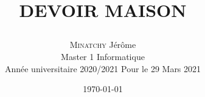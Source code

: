 \documentclass[a4paper]{report}
\title{\LARGE{\begin{center}DEVOIR MAISON\end{center} \leavevmode\newline }}
\author{\textsc{Minatchy} Jérôme\\Master 1 Informatique\\Année universitaire 2020/2021 Pour le 29 Mars 2021}
\date{\today}
\begin{document}





\cleardoublepage
{}


\appendix

%
\end{document}
